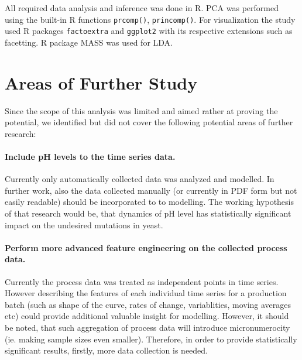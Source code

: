 \documentclass{article}
\begin{document}
All required data analysis and inference was done in R. PCA was performed using the built-in R functions \texttt{prcomp()}, \texttt{princomp()}. For visualization the study used R packages \texttt{factoextra} and \texttt{ggplot2} with its respective extensions such as facetting. R package MASS was used for LDA. 

\clearpage


\clearpage




\section{Areas of Further Study}
Since the scope of this analysis was limited and aimed rather at proving the potential, we identified but did not cover the following potential areas of further research:

\paragraph{Include pH levels to the time series data.} Currently only automatically collected data was analyzed and modelled. In further work, also the data collected manually (or currently in PDF form but not easily readable) should be incorporated to to modelling. The working hypothesis of that research would be, that dynamics of pH level has statistically significant impact on the undesired mutations in yeast.

\paragraph{Perform more advanced feature engineering on the collected process data.} Currently the process data was treated as independent points in time series. However describing the features of each individual time series for a production batch (such as shape of the curve, rates of change, variablities, moving averages etc) could provide additional valuable insight for modelling. However, it should be noted, that such aggregation of process data will introduce micronumerocity (ie. making sample sizes even smaller). Therefore, in order to provide statistically significant results, firstly, more data collection is needed.

\appendix

\end{document}
